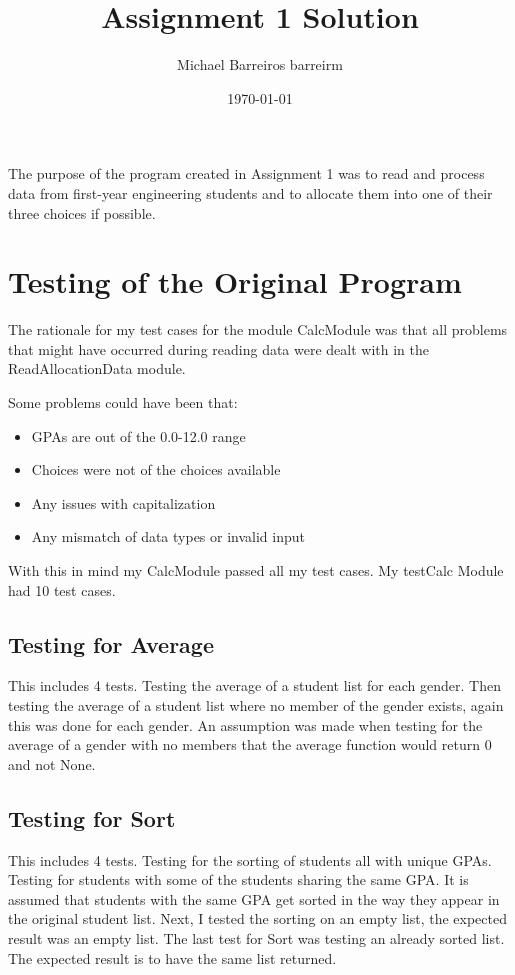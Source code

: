 \documentclass[12pt]{article}
\title{Assignment 1 Solution}
\author{Michael Barreiros barreirm}
\date{\today}
\begin{document}
\maketitle

The purpose of the program created in Assignment 1 was to read and process data from first-year engineering students
and to allocate them into one of their three choices if possible.

\section{Testing of the Original Program}

The rationale for my test cases for the module CalcModule was that all problems that might have occurred during reading data were dealt
with in the ReadAllocationData module. 

Some problems could have been that:
\begin{itemize}

\item GPAs are out of the 0.0-12.0 range
\item Choices were not of the choices available
\item Any issues with capitalization 
\item Any mismatch of data types or invalid input

\end{itemize}

With this in mind my CalcModule passed all my test cases. My testCalc Module had 10 test cases.

\subsection {Testing for Average}

This includes 4 tests. Testing the average of a student list for each gender. Then testing the average of a student list where no member of 
the gender exists, again this was done for each gender. An assumption was made when testing for the average of a gender with no members that 
the average function would return 0 and not None.

\subsection {Testing for Sort}

This includes 4 tests. Testing for the sorting of students all with unique GPAs. Testing for students with some of the students sharing the same 
GPA. It is assumed that students with the same GPA get sorted in the way they appear in the original student list. Next, I tested the sorting on
an empty list, the expected result was an empty list. The last test for Sort was testing an already sorted list. The expected result is to have 
the same list returned.
\end{document}
